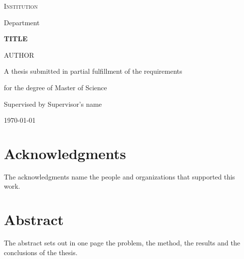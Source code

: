 \documentclass[12pt, openany]{report}
\begin{document}
\begin{titlepage}
  \centering
  {\large\scshape Institution \par}
  {\large Department \par}
  \vspace{3cm}
  {\huge\bfseries {{TITLE}} \par}
  \vspace{2cm}
  {\Large {{AUTHOR}} \par}
  \vspace{2cm}
  A thesis submitted in partial fulfillment of the requirements \par
  for the degree of Master of Science \par
  \vspace{1cm}
  Supervised by Supervisor's name \par
  \vfill
  {\large \today \par}
\end{titlepage}

\chapter*{Acknowledgments}

The acknowledgments name the people and organizations that supported this
work.

\chapter*{Abstract}

The abstract sets out in one page the problem, the method, the results and
the conclusions of the thesis.

\tableofcontents
\listoffigures
\listoftables

\cleardoublepage
{}





\printbibliography[heading=bibintoc]

\appendix

\end{document}
